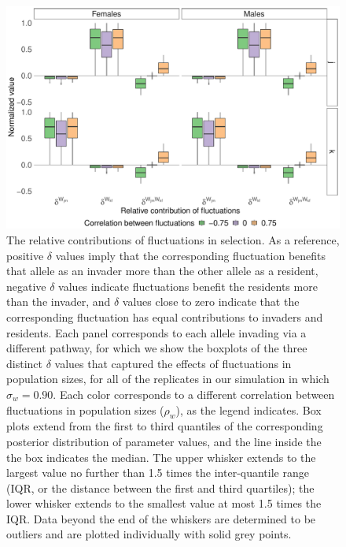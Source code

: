 \begin{figure}[H]
  \centerline{\includegraphics[width=1\textwidth]{box_plots_selection.pdf}}
  \caption{ The relative contributions of fluctuations in selection. As a reference, positive $\delta$ values imply that the corresponding fluctuation benefits that allele as an invader more than the other allele as a resident, negative $\delta$ values indicate fluctuations benefit the residents more than the invader, and $\delta$ values close to zero indicate that the corresponding fluctuation has equal contributions to invaders and residents. Each panel corresponds to each allele invading via a different pathway, for which we show the boxplots of the three distinct $\delta$ values that captured the effects of fluctuations in population sizes, for all of the replicates in our simulation in which $\sigma_{w}=0.90$. Each color corresponds to a different correlation between fluctuations in population sizes ($\rho_{w}$), as the legend indicates. Box plots extend from the first to third quantiles of the corresponding posterior distribution of parameter values, and the line inside the the box indicates the median. The upper whisker extends to the largest value no further than 1.5 times the inter-quantile range (IQR, or the distance between the first and third quartiles); the lower whisker extends to the smallest value at most 1.5 times the IQR. Data beyond the end of the whiskers are determined to be outliers and are plotted individually with solid grey points.  }
    \label{fig:boxes_selection}
\end{figure}
